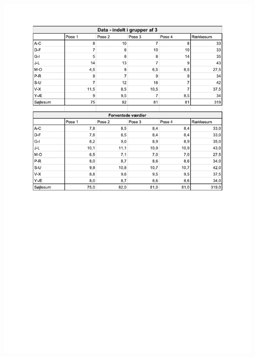 \documentclass[]{article}
\begin{document}
\begin{center}
\includegraphics[width=8in]{tabeller/GruperetDataOgForventedeVardier.pdf}
\end{center}
\end{document}
